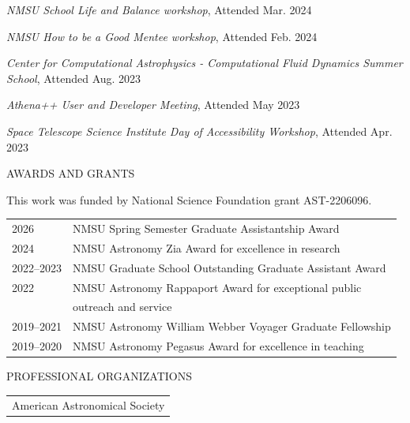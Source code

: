 \hangindent=0.5in \noindent \textit{NMSU School Life and Balance workshop}, Attended Mar. 2024

\hangindent=0.5in \noindent \textit{NMSU How to be a Good Mentee workshop}, Attended Feb. 2024

\hangindent=0.5in \noindent \textit{Center for Computational Astrophysics - Computational Fluid Dynamics Summer School}, Attended Aug. 2023

\hangindent=0.5in \noindent \textit{Athena++ User and Developer Meeting}, Attended May 2023

\hangindent=0.5in \noindent \textit{Space Telescope Science Institute Day of Accessibility Workshop}, Attended Apr. 2023



\begin{center}
AWARDS AND GRANTS
\end{center}

\noindent This work was funded by National Science Foundation grant AST-2206096. 

\begin{flushleft}
\begin{tabular}{ll}
2026 & NMSU Spring Semester Graduate Assistantship Award \\
2024 & NMSU Astronomy Zia Award for excellence in research \\
2022--2023 & NMSU Graduate School Outstanding Graduate Assistant Award \\
2022 & NMSU Astronomy Rappaport Award for exceptional public \\
     & outreach and service \\ 
2019--2021 & NMSU Astronomy William Webber Voyager Graduate Fellowship \\
2019--2020 & NMSU Astronomy Pegasus Award for excellence in teaching \\
\end{tabular}
\end{flushleft}

\medskip

\doublespacing
\begin{center}
PROFESSIONAL ORGANIZATIONS
\end{center}
\begin{flushleft}
\begin{tabular}{l}
American Astronomical Society \\
\end{tabular}
\end{flushleft}

